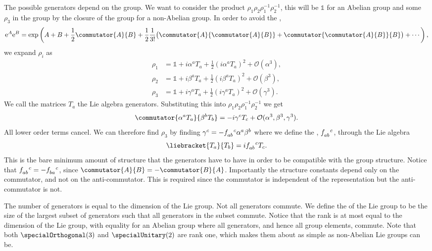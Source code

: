 \documentclass[fleqn]{NotesClass}
\newcommand*{\ident}{\mathbb{1}}
\newcommand*{\e}{\mathrm{e}}
\newcommand*{\order}{\mathcal{O}}
\begin{document}
    The possible generators depend on the group.
    We want to consider the product \(\rho_1\rho_2\rho_1^{-1}\rho_2^{-1}\), this will be \(\ident\) for an Abelian group and some \(\rho_3\) in the group by the closure of the group for a non-Abelian group.
    In order to avoid the ,
    \begin{equation}
        \e^{A}\e^{B} = \exp\left( A + B + \frac{1}{2}\commutator{A}{B} + \frac{1}{2}\frac{1}{3!}\big(\commutator{A}{\commutator{A}{B}} + \commutator{\commutator{A}{B}}{B}\big) + \dotsb \right),
    \end{equation}
    we expand \(\rho_i\) as
    \begin{align}
        \rho_1 &= \ident + i\alpha^a T_a + \frac{1}{2}(i\alpha^aT_a)^2 + \order(\alpha^3),\\
        \rho_2 &= \ident + i\beta^a T_a + \frac{1}{2}(i\beta^aT_a)^2 + \order(\beta^3),\\
        \rho_3 &= \ident + i\gamma^a T_a + \frac{1}{2}(i\gamma^aT_a)^2 + \order(\gamma^3).
    \end{align}
    We call the matrices \(T_a\) the Lie algebra generators.
    Substituting this into \(\rho_1\rho_2\rho_1^{-1}\rho_2^{-1}\) we get
    \begin{equation}
        \commutator{\alpha^aT_a}{\beta^bT_b} = -i\gamma^cT_c + \order(\alpha^3, \beta^3, \gamma^3).
    \end{equation}
    All lower order terms cancel.
    We can therefore find \(\rho_3\) by finding \(\gamma^c = -\tensor{f}{_{ab}^c}\alpha^a\beta^b\) where we define the , \(\tensor{f}{_{ab}^c}\), through the Lie algebra
    \begin{equation}
        \liebracket{T_a}{T_b} = i\tensor{f}{_{ab}^c} T_c.
    \end{equation}
    This is the bare minimum amount of structure that the generators have to have in order to be compatible with the group structure.
    Notice that \(\tensor{f}{_{ab}^c} = -\tensor{f}{_{ba}^c}\), since \(\commutator{A}{B} = -\commutator{B}{A}\).
    Importantly the structure constants depend only on the commutator, and not on the anti-commutator.
    This is required since the commutator is independent of the representation but the anti-commutator is not.
    
    The number of generators is equal to the dimension of the Lie group.
    Not all generators commute.
    We define the  of the Lie group to be the size of the largest subset of generators such that all generators in the subset commute.
    Notice that the rank is at most equal to the dimension of the Lie group, with equality for an Abelian group where all generators, and hence all group elements, commute.
    Note that both \(\specialOrthogonal(3)\) and \(\specialUnitary(2)\) are rank one, which makes them about as simple as non-Abelian Lie groups can be.
    
\end{document}
